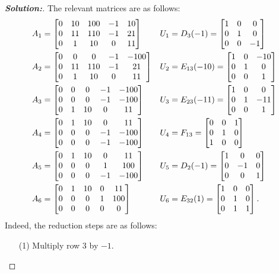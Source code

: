 \documentclass[a4paper]{amsart}
\theoremstyle{definition}
\newenvironment{solution}{\begin{proof}[\textbf{Solution:}] \vphantom{u}}{\end{proof}}
\begin{document}
\begin{solution}
 The relevant matrices are as follows:
 \begin{align*}
  A_1 &= 
    \left[\begin{matrix} 0 & 10 & 100 & -1 &   10 \\
         0 & 11 & 110 & -1 &   21 \\
         0 &  1 &  10 &  0 &   11
    \end{matrix}\right] &
  U_1 &= D_3(-1) = \left[\begin{matrix} 1&0&0 \\ 0&1&0 \\ 0&0&-1 \end{matrix}\right] \\
  A_2 &= 
    \left[\begin{matrix} 0 &  0 &   0 & -1 & -100 \\
         0 & 11 & 110 & -1 &   21 \\
         0 &  1 &  10 &  0 &   11
    \end{matrix}\right] &
  U_2 &= E_{13}(-10) = \left[\begin{matrix} 1&0&-10 \\ 0&1&0 \\ 0&0&1 \end{matrix}\right] \\
  A_3 &= 
    \left[\begin{matrix} 0 &  0 &   0 & -1 & -100 \\
         0 &  0 &   0 & -1 & -100 \\
         0 &  1 &  10 &  0 &   11
    \end{matrix}\right] &
  U_3 &= E_{23}(-11) = \left[\begin{matrix} 1&0&0 \\ 0&1&-11 \\ 0&0&1 \end{matrix}\right] \\
  A_4 &= 
    \left[\begin{matrix} 0 &  1 &  10 &  0 &   11 \\
         0 &  0 &   0 & -1 & -100 \\
         0 &  0 &   0 & -1 & -100
    \end{matrix}\right] &
  U_4 &= F_{13} = \left[\begin{matrix} 0&0&1 \\ 0&1&0 \\ 1&0&0 \end{matrix}\right] \\
  A_5 &= 
    \left[\begin{matrix} 0 &  1 &  10 &  0 &   11 \\
         0 &  0 &   0 &  1 &  100 \\
         0 &  0 &   0 & -1 & -100
    \end{matrix}\right] &
  U_5 &= D_2(-1) = \left[\begin{matrix} 1&0&0 \\ 0&-1&0 \\ 0&0&1 \end{matrix}\right] \\
  A_6 &= 
    \left[\begin{matrix} 0 &  1 &  10 &  0 &   11 \\
         0 &  0 &   0 &  1 &  100 \\
         0 &  0 &   0 &  0 &    0
    \end{matrix}\right] &
  U_6 &= E_{32}(1) = \left[\begin{matrix} 1&0&0 \\ 0&1&0 \\ 0&1&1 \end{matrix}\right].
 \end{align*}
 Indeed, the reduction steps are as follows:
 \begin{itemize}
  \item[(1)] Multiply row $3$ by $-1$.

\end{itemize}
\end{solution}
\end{document}
